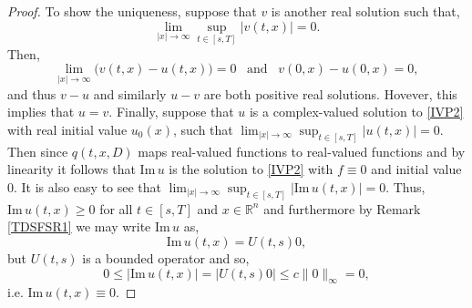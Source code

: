 \documentclass[a4paper, 12pt]{report}
\theoremstyle{remark}
\theoremstyle{definition}
\begin{document}
\begin{proof}
To show the uniqueness, suppose that $v$ is another real solution such that,
$$
\lim_{|x| \to \infty}\sup_{t \in [s, T]}|v(t, x)| = 0.
$$
Then,
$$
\lim_{|x| \to \infty}\big(v(t, x) - u(t, x)\big) = 0 \,\,\,\,\, \text{and} \,\,\,\,\, v(0, x) - u(0, x) = 0,
$$
and thus $v - u$ and similarly $u - v$ are both positive real solutions.  Hovever, this implies that $u = v$.  Finally, suppose that $u$ is a complex-valued solution to \eqref{IVP2} with real initial value $u_0(x)$, such that $\lim_{|x| \to \infty}\sup_{t \in [s, T]}|u(t, x)| = 0$.  Then since $q(t, x, D)$ maps real-valued functions to real-valued functions and by linearity it follows that $\text{Im}\,u$ is the solution to \eqref{IVP2} with $f \equiv 0$ and initial value $0$.  It is also easy to see that $\lim_{|x| \to \infty}\sup_{t \in [s, T]}|\text{Im}\,u(t, x)| = 0$.  Thus, $\text{Im}\,u(t, x) \ge 0$ for all $t \in [s, T]$ and $x \in \mathbb{R}^n$ and furthermore by Remark \ref{TDSFSR1} we may write $\text{Im}\,u$ as,
$$
\text{Im}\,u(t, x) = U(t, s)0,
$$
but $U(t, s)$ is a bounded operator and so,
$$
0 \le |\text{Im}\,u(t, x)| = |U(t, s)0| \le c\|0\|_\infty = 0,
$$
i.e. $\text{Im}\,u(t, x) \equiv 0$.
\end{proof}
\end{document}
